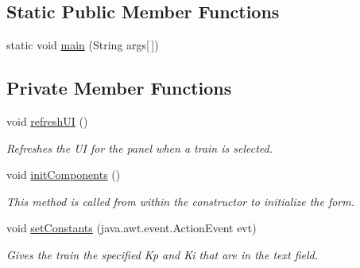 \subsection*{Static Public Member Functions}
\begin{DoxyCompactItemize}
\item 
static void \hyperlink{classTrainControllerComps_1_1TCEngineerPanel_a6803d6eb57e0d56c9d2fa5761d646b81}{main} (String args\mbox{[}$\,$\mbox{]})
\end{DoxyCompactItemize}
\subsection*{Private Member Functions}
\begin{DoxyCompactItemize}
\item 
void \hyperlink{classTrainControllerComps_1_1TCEngineerPanel_a9a2caf8e82d4e5107a9d509e2f8e9bab}{refresh\+UI} ()
\begin{DoxyCompactList}\small\item\em Refreshes the UI for the panel when a train is selected. \end{DoxyCompactList}\item 
void \hyperlink{classTrainControllerComps_1_1TCEngineerPanel_ac63c0a96eec1b142f085a0dd1bb6fd08}{init\+Components} ()
\begin{DoxyCompactList}\small\item\em This method is called from within the constructor to initialize the form. \end{DoxyCompactList}\item 
void \hyperlink{classTrainControllerComps_1_1TCEngineerPanel_ade4281b9ba79bf673f52bf43e6a1591b}{set\+Constants} (java.\+awt.\+event.\+Action\+Event evt)
\begin{DoxyCompactList}\small\item\em Gives the train the specified Kp and Ki that are in the text field. \end{DoxyCompactList}\end{DoxyCompactItemize}
